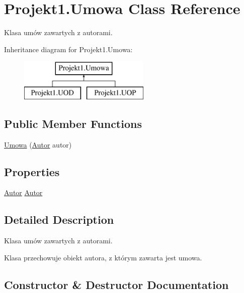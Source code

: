 \hypertarget{class_projekt1_1_1_umowa}{}\section{Projekt1.\+Umowa Class Reference}
\label{class_projekt1_1_1_umowa}


Klasa umów zawartych z autorami.  


Inheritance diagram for Projekt1.\+Umowa\+:\begin{figure}[H]
\begin{center}
\leavevmode
\includegraphics[height=2.000000cm]{class_projekt1_1_1_umowa}
\end{center}
\end{figure}
\subsection*{Public Member Functions}
\begin{DoxyCompactItemize}
\item 
\mbox{\hyperlink{class_projekt1_1_1_umowa_a284be2c18312bec3a0e15e72f2a6d220}{Umowa}} (\mbox{\hyperlink{class_projekt1_1_1_autor}{Autor}} autor)
\end{DoxyCompactItemize}
\subsection*{Properties}
\begin{DoxyCompactItemize}
\item 
\mbox{\hyperlink{class_projekt1_1_1_autor}{Autor}} \mbox{\hyperlink{class_projekt1_1_1_umowa_a117b9b3e033e48843fac7290234369f9}{Autor}}
\end{DoxyCompactItemize}


\subsection{Detailed Description}
Klasa umów zawartych z autorami. 

Klasa przechowuje obiekt autora, z którym zawarta jest umowa. 

\subsection{Constructor \& Destructor Documentation}
\mbox{\label{class_projekt1_1_1_umowa_a284be2c18312bec3a0e15e72f2a6d220}} 
